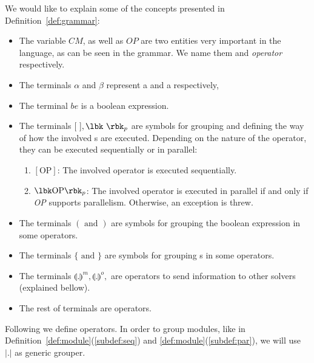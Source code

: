 We would like to explain some of the concepts presented in Definition~\ref{def:grammar}: 
\begin{itemize}
	\item The variable $CM$, as well as $OP$ are two entities very important in the language, as can be seen in the grammar. We name them \cm{} and {\it operator} respectively.
	\item The terminals $\alpha$ and $\beta$ represent a \om{} and a \opch{} respectively,
	\item The terminal $be$ is a boolean expression.
	\item The terminals $[\text{ } ], \lbk\text{ } \rbk_p$ are symbols for grouping and defining the way of how the involved \cm s are executed. Depending on the nature of the operator, they can be executed sequentially or in parallel:
	\begin{enumerate}\renewcommand{\labelitemi}{\scriptsize$\blacksquare$}
		\item $\left[\text{OP}\right]$: The involved operator is executed sequentially.
		\item $\lbk\text{OP}\rbk_p$: The involved operator is executed in parallel if and only if \emph{OP} supports parallelism. Otherwise, an exception is threw.
	\end{enumerate}
	\item The terminals $(\text{ and })$ are symbols for grouping the boolean expression in some operators.
	\item The terminals $\{\text{ and } \}$ are symbols for grouping \cm s in some operators.
	\item The terminals $\llparenthesis. \rrparenthesis^m, \llparenthesis.\rrparenthesis^o,$ are operators to send information to other solvers (explained bellow).
	\item The rest of terminals are \posl{} operators.
\end{itemize}

Following we define \posl{} operators. In order to group modules, like in Definition~\ref{def:module}(\ref{subdef:seq}) and \ref{def:module}(\ref{subdef:par}), we will use $\left|.\right|$ as generic grouper.



